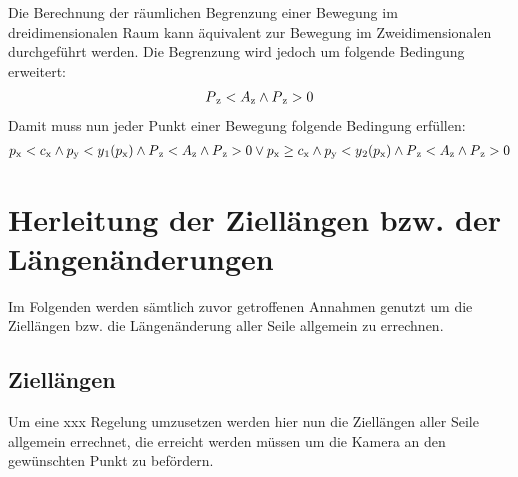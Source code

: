 \documentclass[a4paper, 12pt]{article}
\begin{document}
		Die Berechnung der räumlichen Begrenzung einer Bewegung im dreidimensionalen Raum kann äquivalent zur Bewegung im Zweidimensionalen durchgeführt werden. Die Begrenzung wird jedoch um folgende Bedingung erweitert:
		\begin{align}
		P\textsubscript{z}<A\textsubscript{z}\land P\textsubscript{z}>0
		\end{align}
		Damit muss nun jeder Punkt einer Bewegung folgende Bedingung erfüllen:
		\begin{align}
			p\textsubscript{x}<c\textsubscript{x} 
			\land 	p\textsubscript{y}<y\textsubscript{1}(p\textsubscript{x})
			\land	P\textsubscript{z}<A\textsubscript{z}
			\land 	P\textsubscript{z}>0 
			\lor
			p\textsubscript{x} \geq c\textsubscript{x} 
			\land 	p\textsubscript{y}<y\textsubscript{2}(p\textsubscript{x})
			\land	P\textsubscript{z}<A\textsubscript{z}
			\land 	P\textsubscript{z}>0
		\end{align}
		\pagebreak
	\section{Herleitung der Ziellängen bzw. der Längenänderungen}
	Im Folgenden werden sämtlich zuvor getroffenen Annahmen genutzt um die Ziellängen bzw. die Längenänderung aller Seile allgemein zu errechnen.
		\subsection{Ziellängen}
		Um eine xxx Regelung umzusetzen werden hier nun die Ziellängen aller Seile allgemein errechnet, die erreicht werden müssen um die Kamera an den gewünschten Punkt zu befördern.
\end{document}
